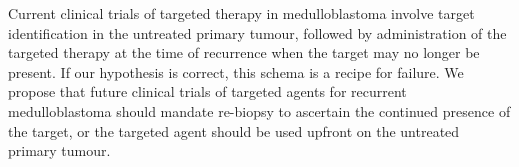 \documentclass[11pt,letterpaper]{article}
\theoremstyle{definition}
\begin{document}
Current clinical trials of targeted therapy in medulloblastoma involve target identification in the untreated primary tumour, followed by administration of the targeted therapy at the time of recurrence when the target may no longer be present. If our hypothesis is correct, this schema is a recipe for failure.  We propose that future clinical trials of targeted agents for recurrent medulloblastoma should mandate re-biopsy to ascertain the continued presence of the target, or the targeted agent should be used upfront on the untreated primary tumour.

\clearpage

\begin{multicols}{2}
\small
{}
\end{multicols}
\end{document}
